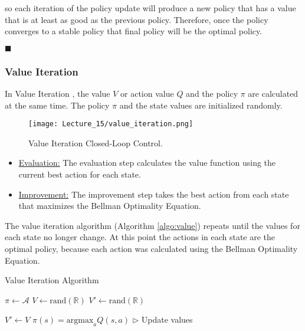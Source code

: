 \documentclass[11pt]{article}
\begin{document}
so each iteration of the policy update will produce a new policy that has a value that is at least as good as the previous policy. Therefore, once the policy converges to a stable policy that final policy will be the optimal policy.

\hfill $\blacksquare$


\subsubsection{Value Iteration}
In Value Iteration \cite{Bel}, the value $V$ or action value $Q$ and the policy $\pi$ are calculated at the same time. The policy $\pi$ and the state values are initialized randomly. 

\begin{figure}[!ht]
\centering
\texttt{[image: Lecture\_15/value\_iteration.png]}
\caption{Value Iteration Closed-Loop Control.}
\end{figure}

\begin{itemize}
    \item \underline{Evaluation:}
    The evaluation step calculates the value function using the current best action for each state.
    \item \underline{Improvement:}
    The improvement step takes the best action from each state that maximizes the Bellman Optimality Equation.
\end{itemize}

The value iteration algorithm (Algorithm \ref{algo:value}) repeats until the values for each state no longer change. At this point the actions in each state are the optimal policy, because each action was calculated using the Bellman Optimality Equation.




\begin{algorithm}[H]
\caption{Value Iteration Algorithm}
\label{algo:value}
\begin{algorithmic}[1]


\STATE $\pi \leftarrow \mathbf{\mathcal{A}}$
\STATE $V \leftarrow \text{rand}(\mathbb{R})$
\STATE $V' \leftarrow \text{rand}(\mathbb{R})$

\STATE $V' \leftarrow V$
    \STATE $\pi(s)=\text{argmax}_a Q(s,a)$
     \hfill $\triangleright$ Update values
\ENDFOR
\ENDWHILE

\end{algorithmic}
\end{algorithm}
\end{document}
